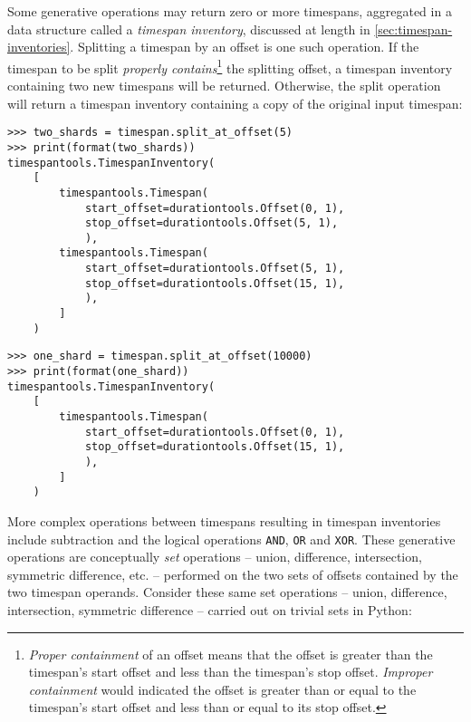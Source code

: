 \noindent Some generative operations may return zero or more timespans,
aggregated in a data structure called a \emph{timespan inventory}, discussed at
length in \autoref{sec:timespan-inventories}. Splitting a timespan by an offset
is one such operation. If the timespan to be split \emph{properly
contains}\footnote{\emph{Proper containment} of an offset means that the offset
is greater than the timespan's start offset and less than the timespan's stop
offset. \emph{Improper containment} would indicated the offset is greater than
or equal to the timespan's start offset and less than or equal to its stop
offset.} the splitting offset, a timespan inventory containing two new
timespans will be returned. Otherwise, the split operation will return a
timespan inventory containing a copy of the original input timespan:

\begin{comment}
<abjad>
two_shards = timespan.split_at_offset(5)
print(format(two_shards))
one_shard = timespan.split_at_offset(10000)
print(format(one_shard))
</abjad>
\end{comment}

\begin{abjadbookoutput}
\begin{singlespacing}
\vspace{-0.5\baselineskip}
\begin{verbatim}
>>> two_shards = timespan.split_at_offset(5)
>>> print(format(two_shards))
timespantools.TimespanInventory(
    [
        timespantools.Timespan(
            start_offset=durationtools.Offset(0, 1),
            stop_offset=durationtools.Offset(5, 1),
            ),
        timespantools.Timespan(
            start_offset=durationtools.Offset(5, 1),
            stop_offset=durationtools.Offset(15, 1),
            ),
        ]
    )
\end{verbatim}
\begin{verbatim}
>>> one_shard = timespan.split_at_offset(10000)
>>> print(format(one_shard))
timespantools.TimespanInventory(
    [
        timespantools.Timespan(
            start_offset=durationtools.Offset(0, 1),
            stop_offset=durationtools.Offset(15, 1),
            ),
        ]
    )
\end{verbatim}
\end{singlespacing}
\end{abjadbookoutput}

\noindent More complex operations between timespans resulting in timespan
inventories include subtraction and the logical operations
\texttt{AND}, \texttt{OR} and \texttt{XOR}. These generative operations are
conceptually \emph{set} operations -- union, difference, intersection,
symmetric difference, etc. -- performed on the two sets of offsets contained by
the two timespan operands. Consider these same set operations -- union,
difference, intersection, symmetric difference -- carried out on trivial sets
in Python:

